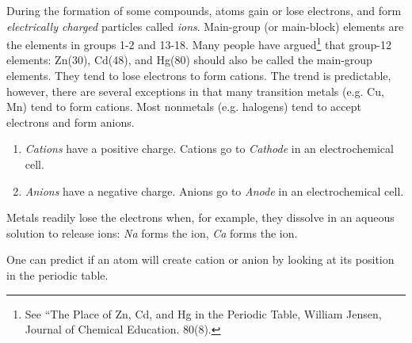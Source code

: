 \documentclass{article}
\begin{document}
During the formation of some compounds, atoms gain or lose electrons, and form \emph{electrically charged} particles called \emph{ions}. Main-group (or main-block) elements are the elements in groups 1-2 and 13-18. Many people have argued\footnote{See ``The Place of Zn, Cd, and Hg in the Periodic Table, William Jensen, Journal of Chemical Education. 80(8).} that group-12 elements: Zn(30), Cd(48), and Hg(80) should also be called the main-group elements. They tend to lose electrons to form cations. The trend is predictable, however, there are several exceptions in that many transition metals (e.g. Cu, Mn) tend to form cations. Most nonmetals (e.g. halogens) tend to accept electrons and form anions. 
\begin{enumerate}
    \item \emph{Cations} have a positive charge. Cations go to \emph{Cathode} in an electrochemical cell.
    \item \emph{Anions} have a negative charge. Anions go to \emph{Anode} in an electrochemical cell.
\end{enumerate}

Metals readily lose the electrons when, for example, they dissolve in an aqueous solution to release ions: \emph{Na} forms the  ion, \emph{Ca} forms the  ion.

One can predict if an atom will create cation or anion by looking at its position in the periodic table.
\end{document}

